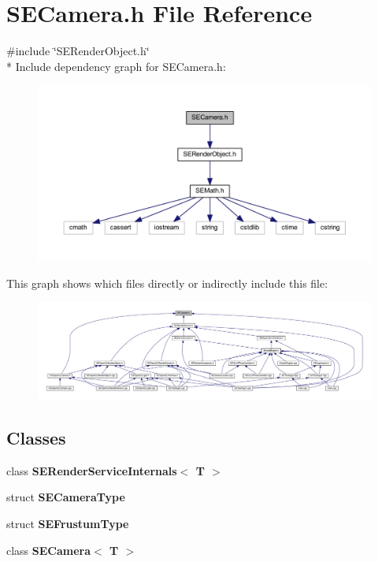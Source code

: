\section{S\+E\+Camera.\+h File Reference}
\label{_s_e_camera_8h}
{\ttfamily \#include \char`\"{}S\+E\+Render\+Object.\+h\char`\"{}}\\*
Include dependency graph for S\+E\+Camera.\+h\+:
\nopagebreak
\begin{figure}[H]
\begin{center}
\leavevmode
\includegraphics[width=350pt]{_s_e_camera_8h__incl}
\end{center}
\end{figure}
This graph shows which files directly or indirectly include this file\+:
\nopagebreak
\begin{figure}[H]
\begin{center}
\leavevmode
\includegraphics[width=350pt]{_s_e_camera_8h__dep__incl}
\end{center}
\end{figure}
\subsection*{Classes}
\begin{DoxyCompactItemize}
\item 
class {\bf S\+E\+Render\+Service\+Internals$<$ T $>$}
\item 
struct {\bf S\+E\+Camera\+Type}
\item 
struct {\bf S\+E\+Frustum\+Type}
\item 
class {\bf S\+E\+Camera$<$ T $>$}
\end{DoxyCompactItemize}
